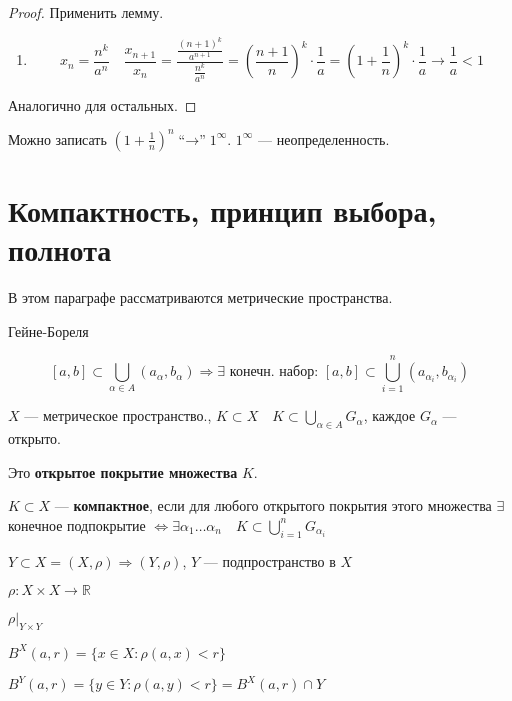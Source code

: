 \begin{proof}
    Применить лемму.
    \begin{enumerate}
        \item $$x_n=\frac{n^k}{a^n} \quad \frac{x_{n+1}}{x_n}=\frac{\frac{(n+1)^k}{a^{n+1}}}{\frac{n^k}{a^n}} = (\frac{n+1}{n})^k\cdot\frac{1}{a}=(1+\frac{1}{n})^k\cdot\frac{1}{a}\to\frac{1}{a}<1$$
    \end{enumerate}
    Аналогично для остальных.
\end{proof}

Можно записать $(1+\frac{1}{n})^n \text{``$\to$''} 1^\infty$. $1^\infty$ --- неопределенность.

\section{Компактность, принцип выбора, полнота}

В этом параграфе рассматриваются метрические пространства.

\begin{lemma}
    Гейне-Бореля

    $$[a,b]\subset \bigcup\limits_{\alpha\in A} (a_\alpha, b_\alpha) \Rightarrow \exists \text{ конечн. набор: } [a,b]\subset\bigcup\limits_{i=1}^n(a_{\alpha_i},b_{\alpha_i})$$
\end{lemma}

\begin{definition}
    $X$ --- метрическое пространство., $K\subset X \quad K\subset\bigcup\limits_{\alpha\in A} G_\alpha$, каждое $G_\alpha$ --- открыто.
    
    Это \textbf{открытое покрытие множества} $K$.
\end{definition}

\begin{definition}
    $K\subset X$ --- \textbf{компактное}, если для любого открытого покрытия этого множества $\exists$ конечное подпокрытие $\Leftrightarrow \exists \alpha_1\ldots \alpha_n \quad K\subset\bigcup\limits_{i=1}^n G_{\alpha_i}$
\end{definition}

$Y\subset X=(X,\rho) \Rightarrow (Y, \rho)$, $Y$ --- подпространство в $X$

$\rho: X\times X\to\mathbb{R}$

$\rho|_{Y\times Y}$

$B^X(a,r)=\{x\in X: \rho(a,x)<r\}$

$B^Y(a,r)=\{y\in Y:\rho(a, y)<r\} = B^X(a,r)\cap Y$

